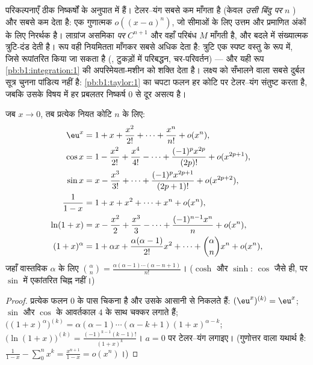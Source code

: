 \begin{remark}[तीन सूत्र, तीन क़ीमतें, तीन उत्पाद]
परिकल्पनाएँ ठीक निष्कर्षों के अनुपात में हैं। टेलर--यंग सबसे कम माँगता है
(केवल \emph{उसी बिंदु पर} $n$ ) और सबसे कम देता है: एक गुणात्मक
$o((x-a)^n)$, जो सीमाओं के लिए उत्तम और प्रमाणित अंकों के लिए निरर्थक है।
लाग्रांज असमिका \emph{ पर} $C^{n+1}$ और वहाँ परिबंध $M$ माँगती है, और
बदले में संख्यात्मक त्रुटि-दंड देती है।  रूप वही नियमितता माँगकर सबसे
अधिक देता है: त्रुटि एक स्पष्ट वस्तु के रूप में, जिसे रूपांतरित किया जा सकता
है (, टुकड़ों में परिबद्धन, चर-परिवर्तन) --- और यही रूप
\cref{pb:b1:integration:1} की अपरिमेयता-मशीन को शक्ति देता है। लक्ष्य को
सँभालने वाला सबसे दुर्बल सूत्र चुनना पांडित्य नहीं है: \cref{pb:b1:taylor:1}
का चपटा फलन हर कोटि पर टेलर--यंग संतुष्ट करता है, जबकि उसके विषय में हर
प्रबलतर निष्कर्ष $0$ से दूर असत्य है।
\end{remark}

\begin{proposition}[$0$ पर मानक प्रसार]
जब $x \to 0$, तब प्रत्येक नियत कोटि $n$ के लिए:
\begin{align*}
\eu^x &= 1 + x + \frac{x^2}{2!} + \dots + \frac{x^n}{n!} + o(x^n),\\
\cos x &= 1 - \frac{x^2}{2!} + \frac{x^4}{4!} - \dots
+ \frac{(-1)^p x^{2p}}{(2p)!} + o(x^{2p+1}),\\
\sin x &= x - \frac{x^3}{3!} + \dots + \frac{(-1)^p
x^{2p+1}}{(2p+1)!} + o(x^{2p+2}),\\
\frac{1}{1 - x} &= 1 + x + x^2 + \dots + x^n + o(x^n),\\
\ln(1 + x) &= x - \frac{x^2}{2} + \frac{x^3}{3} - \dots +
\frac{(-1)^{n-1} x^n}{n} + o(x^n),\\
(1 + x)^\alpha &= 1 + \alpha x + \frac{\alpha(\alpha-1)}{2!}x^2 +
\dots + \binom{\alpha}{n} x^n + o(x^n),
\end{align*}
जहाँ वास्तविक $\alpha$ के लिए $\binom{\alpha}{n} = \frac{\alpha(\alpha -
1)\cdots(\alpha - n + 1)}{n!}$। ($\cosh$ और $\sinh$: $\cos$ जैसे ही, पर
$\sin$ में एकांतरित चिह्न नहीं।) \label{prop:b1:taylor:standard}
\end{proposition}

\begin{proof}
प्रत्येक फलन $0$ के पास चिकना है और उसके  आसानी से निकलते हैं:
$(\eu^x)^{(k)} = \eu^x$; $\sin$ और $\cos$ के  आवर्तकाल $4$ के साथ चक्कर
लगाते हैं; $\bigl((1+x)^\alpha\bigr)^{(k)} = \alpha(\alpha - 1)\cdots(\alpha
- k + 1)(1+x)^{\alpha - k}$; $\bigl(\ln(1+x)\bigr)^{(k)} =
\frac{(-1)^{k-1}(k-1)!}{(1+x)^k}$। $a = 0$ पर टेलर--यंग लगाइए। (गुणोत्तर
वाला यथार्थ है: $\frac{1}{1-x} - \sum_0^n x^k = \frac{x^{n+1}}{1 - x} =
o(x^n)$।)
\end{proof}

